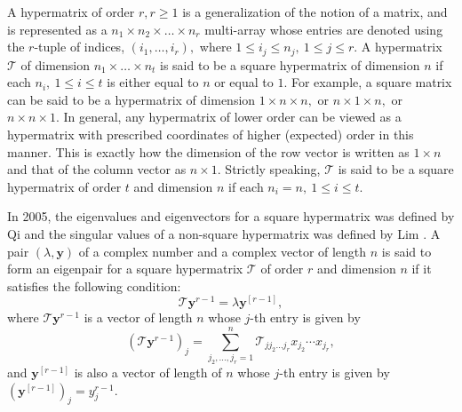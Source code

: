 \documentclass[10pt,a4paper]{article}
\begin{document}
	A hypermatrix of order $r, r \geq 1$ is a generalization of the notion of a matrix, and is represented as a $n_1 \times n_2 \times \ldots \times n_r$ multi-array whose entries are denoted using the $r$-tuple of indices, $(i_1,\ldots, i_r),$ where $1 \leq i_j \leq n_j, ~ 1 \leq j \leq r.$    
	A hypermatrix $\mathcal{T}$ of dimension $n_1 \times \ldots \times n_t $ is said to be a square hypermatrix of dimension $n$ if each $n_i, ~ 1 \leq i \leq t$ is either equal to $n$ or equal to $1$.
	For example, a square matrix can be said to be a hypermatrix of dimension $1 \times n \times n,$ or $n \times 1 \times n,$ or $n \times n \times 1$. 
	In general, any hypermatrix of lower order can be viewed as a hypermatrix with prescribed coordinates of higher (expected) order in this manner. 
	This is exactly how the dimension of the row vector is written as $1 \times n$ and that of the column vector as $n \times 1. $ Strictly speaking, $\mathcal{T}$ is said to be a square hypermatrix of order $t$ and dimension $n$ if each $n_i = n, ~ 1 \leq i \leq t$.
	
	In 2005, the eigenvalues and eigenvectors for a square hypermatrix was defined by Qi \cite{qi2005eigenvalues} and the singular values of a non-square hypermatrix was defined by Lim \cite{lim2005singular}. 
	A pair $(\lambda, \mathbf{y})$ of a complex number and a complex vector of length $n$ is said to form an eigenpair for a square hypermatrix $\mathcal{T}$ of order $r$ and dimension $n$ if it satisfies the following condition:
	\begin{equation*}
		\mathcal{T} \mathbf{y}^{r-1} = \lambda \mathbf{y}^{[r-1]},
	\end{equation*}
	where $\mathcal{T} \mathbf{y}^{r-1} $ is a vector of length $n$ whose $j$-th entry is given by 
	\begin{equation*}
		(\mathcal{T} \mathbf{y}^{r-1})_j = \sum\limits_{j_2,\ldots, j_r=1}^n \mathcal{T}_{jj_2\ldots j_r}x_{j_2}\cdots x_{j_r}, 
	\end{equation*}
	and $\mathbf{y}^{[r-1]}$ is also a vector of length of $n$  whose $j$-th entry is given by  $(\mathbf{y}^{[r-1]})_j = y_j^{r-1}.$ 
	
\end{document}
